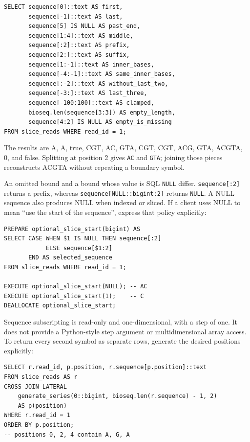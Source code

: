 \par\noindent\begin{minipage}{\linewidth}
\begin{lstlisting}[style=bioseq-appendix-sql]
SELECT sequence[0]::text AS first,
       sequence[-1]::text AS last,
       sequence[5] IS NULL AS past_end,
       sequence[1:4]::text AS middle,
       sequence[:2]::text AS prefix,
       sequence[2:]::text AS suffix,
       sequence[1:-1]::text AS inner_bases,
       sequence[-4:-1]::text AS same_inner_bases,
       sequence[:-2]::text AS without_last_two,
       sequence[-3:]::text AS last_three,
       sequence[-100:100]::text AS clamped,
       bioseq.len(sequence[3:3]) AS empty_length,
       sequence[4:2] IS NULL AS empty_is_missing
FROM slice_reads WHERE read_id = 1;
\end{lstlisting}
\end{minipage}

The results are A, A, true, CGT, AC, GTA, CGT, CGT, ACG, GTA, ACGTA, 0,
and false. Splitting at position 2 gives \texttt{AC} and \texttt{GTA}; joining
those pieces reconstructs ACGTA without repeating a boundary symbol.

An omitted bound and a bound whose value is SQL \texttt{NULL} differ.
\texttt{sequence[:2]} returns a prefix, whereas
\texttt{sequence[NULL::bigint:2]} returns \texttt{NULL}. A NULL sequence
also produces NULL when indexed or sliced. If a client uses NULL to mean
``use the start of the sequence'', express that policy explicitly:

\par\noindent\begin{minipage}{\linewidth}
\begin{lstlisting}[style=bioseq-appendix-sql]
PREPARE optional_slice_start(bigint) AS
SELECT CASE WHEN $1 IS NULL THEN sequence[:2]
            ELSE sequence[$1:2]
       END AS selected_sequence
FROM slice_reads WHERE read_id = 1;

EXECUTE optional_slice_start(NULL); -- AC
EXECUTE optional_slice_start(1);    -- C
DEALLOCATE optional_slice_start;
\end{lstlisting}
\end{minipage}

Sequence subscripting is read-only and one-dimensional, with a step of one.
It does not provide a Python-style step argument or multidimensional array
access. To return every second symbol as separate rows, generate the desired
positions explicitly:

\par\noindent\begin{minipage}{\linewidth}
\begin{lstlisting}[style=bioseq-appendix-sql]
SELECT r.read_id, p.position, r.sequence[p.position]::text
FROM slice_reads AS r
CROSS JOIN LATERAL
    generate_series(0::bigint, bioseq.len(r.sequence) - 1, 2)
    AS p(position)
WHERE r.read_id = 1
ORDER BY p.position;
-- positions 0, 2, 4 contain A, G, A
\end{lstlisting}
\end{minipage}

